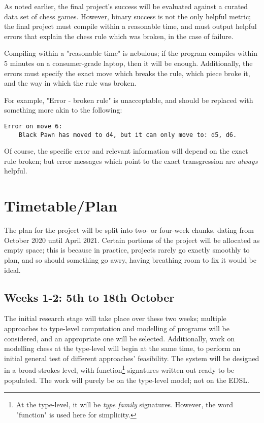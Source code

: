\documentclass[12pt, a4paper]{scrartcl}
\begin{document}
As noted earlier, the final project's success will be evaluated against a curated data set of chess games. However, binary success is not the only helpful metric; the final project must compile within a reasonable time, and must output helpful errors that explain the chess rule which was broken, in the case of failure.

Compiling within a "reasonable time" is nebulous; if the program compiles within 5 minutes on a consumer-grade laptop, then it will be enough. Additionally, the errors must specify the exact move which breaks the rule, which piece broke it, and the way in which the rule was broken.

For example, "Error - broken rule" is unacceptable, and should be replaced with something more akin to the following:

\begin{lstlisting}
Error on move 6:
    Black Pawn has moved to d4, but it can only move to: d5, d6.
\end{lstlisting}

Of course, the specific error and relevant information will depend on the exact rule broken; but error messages which point to the exact transgression are \emph{always} helpful.

\section{Timetable/Plan}

The plan for the project will be split into two- or four-week chunks, dating from October 2020 until April 2021. Certain portions of the project will be allocated as empty space; this is because in practice, projects rarely go exactly smoothly to plan, and so should something go awry, having breathing room to fix it would be ideal.

\subsection{Weeks 1-2: 5th to 18th October}

The initial research stage will take place over these two weeks; multiple approaches to type-level computation and modelling of programs will be considered, and an appropriate one will be selected. Additionally, work on modelling chess at the type-level will begin at the same time, to perform an initial general test of different approaches' feasibility. The system will be designed in a broad-strokes level, with function\footnote{At the type-level, it will be \emph{type family} signatures. However, the word "function" is used here for simplicity.} signatures written out ready to be populated. The work will purely be on the type-level model; not on the EDSL.
\end{document}
